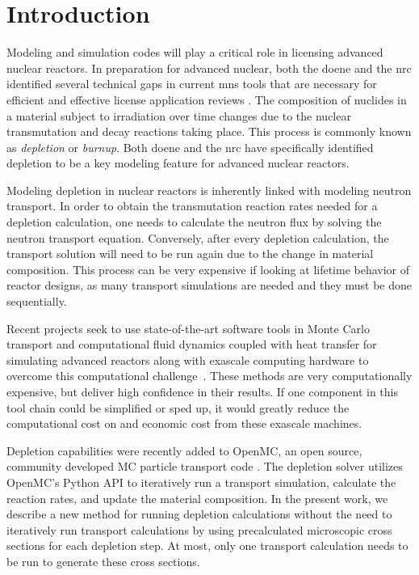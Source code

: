 \section{Introduction}\label{}
    Modeling and simulation codes will play a critical role in licensing
    advanced nuclear reactors. In preparation for advanced nuclear, both the
    \Gls{doene} and the \Gls{nrc} identified several technical gaps in current
    \Gls{mns} tools that are necessary for efficient and effective license
    application reviews \citep{betzler_modeling_2019, usnrc_nonlwr_2020-1}.
    The composition of nuclides in a material subject to irradiation over time
    changes due to the nuclear transmutation and decay reactions taking place.
    This process is commonly known as {\it depletion} or {\it burnup}.  Both
    \Gls{doene} and the \Gls{nrc} have specifically identified depletion to be a
    key modeling feature for advanced nuclear reactors.

    Modeling depletion in nuclear reactors is inherently linked with modeling
    neutron transport. In order to obtain the transmutation reaction rates
    needed for a depletion calculation, one needs to calculate the neutron flux
    by solving the neutron transport equation. Conversely, after every depletion
    calculation, the transport solution will need to be run again due to the
    change in material composition. This process can be very expensive if
    looking at lifetime behavior of reactor designs, as many transport
    simulations are needed and they must be done sequentially.

    Recent projects seek to use state-of-the-art software tools in Monte Carlo
    transport and computational fluid dynamics coupled with heat transfer for
    simulating advanced reactors along with exascale computing hardware to
    overcome this computational challenge~\citep{romano2021nse,merzari2023sc}.
    These methods are very computationally expensive, but deliver high
    confidence in their results. If one component in this tool chain could be
    simplified or sped up, it would greatly reduce the computational cost on and
    economic cost from these exascale machines.

    Depletion capabilities were recently added to OpenMC, an open source,
    community developed MC particle transport code \citep{romano_openmc_2015,
    romano_depletion_2021}. The depletion solver utilizes OpenMC's Python API to
    iteratively run a transport simulation, calculate the reaction rates, and
    update the material composition. In the present work, we describe a new
    method for running depletion calculations without the need to iteratively
    run transport calculations by using precalculated microscopic cross sections
    for each depletion step. At most, only one transport calculation needs to be
    run to generate these cross sections.

